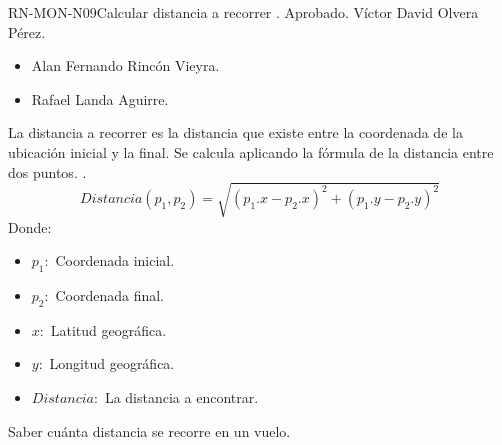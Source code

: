 %
\begin{BusinessRule}{RN-MON-N09}{Calcular distancia a recorrer}
	{\bcDerivation}
	{\btTimer}
	{\blControlling}
	.
	\BRItem[Estado] Aprobado.
	 Víctor David Olvera Pérez.
	 \cdtEmpty
	\begin{itemize}
		\item Alan Fernando Rincón Vieyra.
		\item Rafael Landa Aguirre.
	\end{itemize}
	\BRItem[Descripción] La distancia a recorrer es la distancia que existe 
	entre la coordenada de la ubicación inicial y la final. Se calcula 
	aplicando la fórmula de la distancia entre dos puntos.
	\BRItem[Sentencia] .
	\begin{equation*}
	Distancia(p_{1}, p_{2}) = \sqrt{\left ( p_{1}.x - p_{2}.x \right )^2 + 
	\left ( p_{1}.y - p_{2}.y \right )^2}
	\end{equation*}
	Donde:
		\begin{itemize}
			\item \texttt{$p_{1}:$} Coordenada inicial.
			\item \texttt{$p_{2}:$} Coordenada final.
			\item \texttt{$x:$} Latitud geográfica.
			\item \texttt{$y:$} Longitud geográfica.
			\item \texttt{$Distancia:$} La distancia a encontrar.
		\end{itemize}
	\BRItem[Motivación] Saber cuánta distancia se recorre en un vuelo.
\end{BusinessRule}


